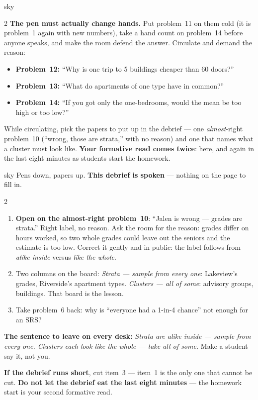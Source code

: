 \documentclass[10pt]{article}
\begin{document}
\begin{skillbox}{sky}
\begin{multicols}{2}
\textbf{The pen must actually change hands.} Put problem~11 on them cold (it is problem~1 again
with new numbers), take a hand count on problem~14 before anyone speaks, and make the room
defend the answer. Circulate and demand the reason:
\begin{itemize}[leftmargin=1.1em, nosep]
  \item \textbf{Problem~12:} ``Why is one trip to 5 buildings cheaper than 60 doors?''
  \item \textbf{Problem~13:} ``What do apartments of one type have in common?''
  \item \textbf{Problem~14:} ``If you got only the one-bedrooms, would the mean be too high or
        too low?''
\end{itemize}
While circulating, pick the papers to put up in the debrief --- one \emph{almost}-right
problem~10 (``wrong, those are strata,'' with no reason) and one that names what a cluster
must look like. \textbf{Your formative read comes twice}: here, and again in the last eight
minutes as students start the homework.
\end{multicols}
\end{skillbox}

\boxguard
\begin{skillbox}{sky}
Pens down, papers up. \textbf{This debrief is spoken} --- nothing on the page to fill in.
\begin{multicols}{2}
\begin{enumerate}[leftmargin=1.3em, nosep, itemsep=3pt]
  \item \textbf{Open on the almost-right problem~10}: ``Jalen is wrong --- grades are strata.''
        Right label, no reason. Ask the room for the reason: grades differ on hours worked, so
        two whole grades could leave out the seniors and the estimate is too low. Correct it
        gently and in public: the label follows from \emph{alike inside} versus \emph{like the
        whole}.
  \item Two columns on the board: \emph{Strata --- sample from every one}: Lakeview's grades,
        Riverside's apartment types. \emph{Clusters --- all of some}: advisory groups,
        buildings. That board is the lesson.
  \item Take problem~6 back: why is ``everyone had a 1-in-4 chance'' not enough for an SRS?
\end{enumerate}
\columnbreak
\textbf{The sentence to leave on every desk:} \emph{Strata are alike inside --- sample from
every one. Clusters each look like the whole --- take all of some.} Make a student say it, not
you.

\textbf{If the debrief runs short}, cut item~3 --- item~1 is the only one that cannot be cut.
\textbf{Do not let the debrief eat the last eight minutes} --- the homework start is your
second formative read.
\end{multicols}
\end{skillbox}
\end{document}
